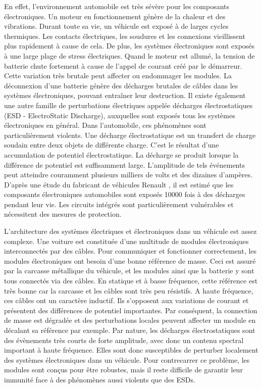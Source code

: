 En effet, l'environnement automobile est très sévère pour les composants électroniques.
Un moteur en fonctionnement génère de la chaleur et des vibrations.
Durant toute sa vie, un véhicule est exposé à de larges cycles thermiques.
Les contacts électriques, les soudures et les connexions vieillissent plus rapidement à cause de cela.
De plus, les systèmes électroniques sont exposés à une large plage de stress électriques.
Quand le moteur est allumé, la tension de batterie chute fortement à cause de l'appel de courant créé par le démarreur.
Cette variation très brutale peut affecter ou endommager les modules.
La déconnexion d'une batterie génère des décharges brutales de câbles dans les systèmes électroniques, pouvant entraîner leur destruction.
Il existe également une autre famille de perturbations électriques appelée décharges électrostatiques (ESD - ElectroStatic Discharge), auxquelles sont exposés tous les systèmes électroniques en général.
Dans l'automobile, ces phénomènes sont particulièrement violents.
Une décharge électrostatique est un transfert de charge soudain entre deux objets de différente charge.
C'est le résultat d'une accumulation de potentiel électrostatique.
La décharge se produit lorsque la différence de potentiel est suffisamment large.
L'amplitude de tels événements peut atteindre couramment plusieurs milliers de volts et des dizaines d'ampères.
D'après une étude du fabricant de véhicules Renault \cite{Renault-esd}, il est estimé que les composants électroniques automobiles sont exposés 10000 fois à des décharges pendant leur vie.
Les circuits intégrés sont particulièrement vulnérables \cite{impactESDsemiconductors} et nécessitent des mesures de protection.

L'architecture des systèmes électriques et électroniques dans un véhicule est assez complexe.
Une voiture est constituée d'une multitude de modules électroniques interconnectés par des câbles.
Pour communiquer et fonctionner correctement, les modules électroniques ont besoin d'une bonne référence de masse.
Ceci est assuré par la carcasse métallique du véhicule, et les modules ainsi que la batterie y sont tous connectés via des câbles.
En statique et à basse fréquence, cette référence est très bonne car la carcasse et les câbles sont très peu résistifs.
A haute fréquence, ces câbles ont un caractère inductif.
Ils s'opposent aux variations de courant et présentent des différences de potentiel importantes.
Par conséquent, la connection de masse est dégradée et des perturbations locales peuvent affecter un module en décalant sa référence par exemple.
Par nature, les décharges électrostatiques sont des évènements très courts de forte amplitude, avec donc un contenu spectral important à haute fréquence.
Elles sont donc susceptibles de perturber localement des systèmes électroniques dans un véhicule.
Pour contrecarrer ce problème, les modules sont conçus pour être robustes, mais il reste difficile de garantir leur immunité face à des phénomènes aussi violents que des ESDs.

